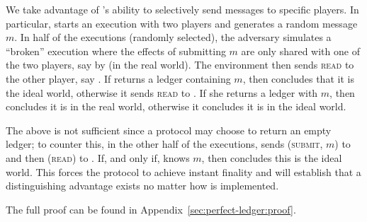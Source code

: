   \begin{proofsketch}
    We take advantage of \adversary's ability to selectively send messages to
    specific players. In particular, \environment{} starts an execution with two
    players and generates a random message $m$. In half of the executions
    (randomly selected),  the adversary simulates a ``broken''  \perfectprot{}
    execution where the effects of submitting $m$ are only shared with one of
    the two players, say \alice{} by \adversary{} (in the real world). The
    environment then sends \textsc{read} to the other player, say \bob. If
    \bob{} returns a ledger containing $m$, then \environment{} concludes that
    it is the ideal world, otherwise it sends \textsc{read} to \alice. If she
    returns a ledger with $m$, then \environment{} concludes it is in the real
    world, otherwise it concludes it is in the ideal world.

    The above is not sufficient since a protocol may choose to return an empty
    ledger; to counter this, in the other half of the executions, \environment{}
    sends (\textsc{submit}, $m$) to \alice{} and then (\textsc{read}) to \bob.
    If, and only if, \bob{} knows $m$, then \environment{} concludes this is the
    ideal world. This forces the \perfectprot{} protocol to achieve instant
    finality and will establish that a distinguishing advantage exists no matter
    how \perfectprot{} is implemented.
  \end{proofsketch}

  The full proof can be found in Appendix~\ref{sec:perfect-ledger:proof}.
